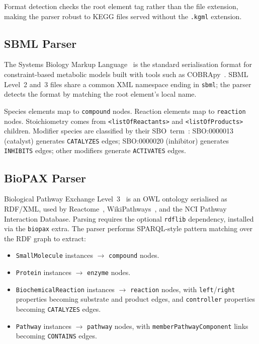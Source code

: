 \documentclass[10pt]{article}
\begin{document}
Format detection checks the root element tag rather than the file extension,
making the parser robust to KEGG files served without the \texttt{.kgml}
extension.

\subsection{SBML Parser}

The Systems Biology Markup Language~\citep{keating2020sbml} is the standard
serialisation format for constraint-based metabolic models built with tools
such as COBRApy~\citep{ebrahim2013cobrapy}. SBML Level~2 and~3 files share a
common XML namespace ending in \texttt{sbml}; the parser detects the format by
matching the root element's local name.

Species elements map to \texttt{compound} nodes. Reaction elements map to
\texttt{reaction} nodes. Stoichiometry comes from
\texttt{<listOfReactants>} and \texttt{<listOfProducts>} children. Modifier
species are classified by their SBO~term~\citep{courtot2011sbo}: SBO:0000013
(catalyst) generates \texttt{CATALYZES} edges; SBO:0000020 (inhibitor)
generates \texttt{INHIBITS} edges; other modifiers generate
\texttt{ACTIVATES} edges.

\subsection{BioPAX Parser}

Biological Pathway Exchange Level~3~\citep{demir2010biopax} is an OWL
ontology serialised as RDF/XML, used by Reactome~\citep{jassal2020reactome},
WikiPathways~\citep{martens2021wikipathways}, and the NCI Pathway Interaction
Database. Parsing requires the optional \texttt{rdflib} dependency, installed
via the \texttt{biopax} extra. The parser performs SPARQL-style pattern
matching over the RDF graph to extract:

\begin{itemize}[leftmargin=*,itemsep=2pt]
  \item \texttt{SmallMolecule} instances $\to$ \texttt{compound} nodes.
  \item \texttt{Protein} instances $\to$ \texttt{enzyme} nodes.
  \item \texttt{BiochemicalReaction} instances $\to$ \texttt{reaction} nodes,
    with \texttt{left}/\texttt{right} properties becoming substrate and
    product edges, and \texttt{controller} properties becoming
    \texttt{CATALYZES} edges.
  \item \texttt{Pathway} instances $\to$ \texttt{pathway} nodes, with
    \texttt{memberPathwayComponent} links becoming \texttt{CONTAINS} edges.
\end{itemize}
\end{document}
